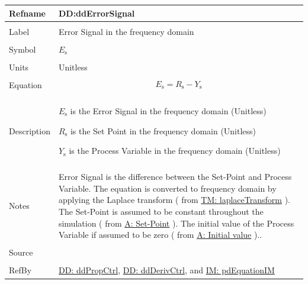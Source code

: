 \documentclass[12pt]{article}
\begin{document}
\vspace{\baselineskip}
\noindent
\begin{minipage}{\textwidth}
\begin{tabular}{>{\raggedright}p{}>{\raggedright\arraybackslash}p{}}
\toprule \textbf{Refname} & \textbf{DD:ddErrorSignal}
\label{DD:ddErrorSignal}
\\ \midrule \\
Label & Error Signal in the frequency domain
        
\\ \midrule \\
Symbol & ${E_{\text{s}}}$
         
\\ \midrule \\
Units & Unitless
        
\\ \midrule \\
Equation & \begin{displaymath}
           {E_{\text{s}}}={R_{\text{s}}}-{Y_{\text{s}}}
           \end{displaymath}
\\ \midrule \\
Description & \begin{symbDescription}
              \item{${E_{\text{s}}}$ is the Error Signal in the frequency domain (Unitless)}
              \item{${R_{\text{s}}}$ is the Set Point in the frequency domain (Unitless)}
              \item{${Y_{\text{s}}}$ is the Process Variable in the frequency domain (Unitless)}
              \end{symbDescription}
\\ \midrule \\
Notes & Error Signal is the difference between the Set-Point and  Process Variable. The equation is converted to frequency domain by applying the Laplace transform ( from \hyperref[TM:laplaceTransform]{TM: laplaceTransform} ). The Set-Point is assumed to be constant throughout the simulation ( from  \hyperref[setPoint]{A: Set-Point} ). The initial value of the Process Variable if assumed to be zero ( from  \hyperref[initialValue]{A: Initial value} )..
        
\\ \midrule \\
Source & \cite{johnson2008}
         
\\ \midrule \\
RefBy & \hyperref[DD:ddPropCtrl]{DD: ddPropCtrl}, \hyperref[DD:ddDerivCtrl]{DD: ddDerivCtrl}, and \hyperref[IM:pdEquationIM]{IM: pdEquationIM}
        
\\ \bottomrule
\end{tabular}
\end{minipage}
\end{document}
